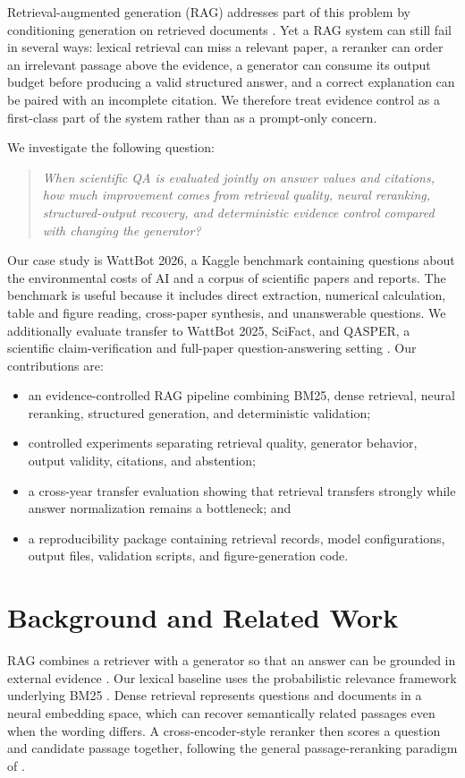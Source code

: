 \documentclass[11pt]{article}
\begin{document}
Retrieval-augmented generation (RAG) addresses part of this problem by conditioning generation on retrieved documents \citep{lewis2020rag}. Yet a RAG system can still fail in several ways: lexical retrieval can miss a relevant paper, a reranker can order an irrelevant passage above the evidence, a generator can consume its output budget before producing a valid structured answer, and a correct explanation can be paired with an incomplete citation. We therefore treat evidence control as a first-class part of the system rather than as a prompt-only concern.

We investigate the following question:
\begin{quote}
\emph{When scientific QA is evaluated jointly on answer values and citations, how much improvement comes from retrieval quality, neural reranking, structured-output recovery, and deterministic evidence control compared with changing the generator?}
\end{quote}

Our case study is WattBot 2026, a Kaggle benchmark containing questions about the environmental costs of AI and a corpus of scientific papers and reports. The benchmark is useful because it includes direct extraction, numerical calculation, table and figure reading, cross-paper synthesis, and unanswerable questions. We additionally evaluate transfer to WattBot 2025, SciFact, and QASPER, a scientific claim-verification and full-paper question-answering setting \citep{wadden2020scifact,dasigi2021qasper}. Our contributions are:
\begin{itemize}
\item an evidence-controlled RAG pipeline combining BM25, dense retrieval, neural reranking, structured generation, and deterministic validation;
\item controlled experiments separating retrieval quality, generator behavior, output validity, citations, and abstention;
\item a cross-year transfer evaluation showing that retrieval transfers strongly while answer normalization remains a bottleneck; and
\item a reproducibility package containing retrieval records, model configurations, output files, validation scripts, and figure-generation code.
\end{itemize}

\section{Background and Related Work}
\label{sec:related}
RAG combines a retriever with a generator so that an answer can be grounded in external evidence \citep{lewis2020rag}. Our lexical baseline uses the probabilistic relevance framework underlying BM25 \citep{robertson2009bm25}. Dense retrieval represents questions and documents in a neural embedding space, which can recover semantically related passages even when the wording differs. A cross-encoder-style reranker then scores a question and candidate passage together, following the general passage-reranking paradigm of \citet{nogueira2019bert}.
\end{document}

